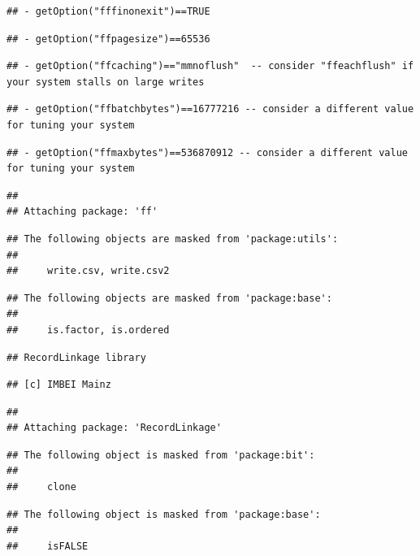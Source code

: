 \documentclass[
]{article}
\begin{document}
\begin{verbatim}
## - getOption("fffinonexit")==TRUE
\end{verbatim}

\begin{verbatim}
## - getOption("ffpagesize")==65536
\end{verbatim}

\begin{verbatim}
## - getOption("ffcaching")=="mmnoflush"  -- consider "ffeachflush" if your system stalls on large writes
\end{verbatim}

\begin{verbatim}
## - getOption("ffbatchbytes")==16777216 -- consider a different value for tuning your system
\end{verbatim}

\begin{verbatim}
## - getOption("ffmaxbytes")==536870912 -- consider a different value for tuning your system
\end{verbatim}

\begin{verbatim}
## 
## Attaching package: 'ff'
\end{verbatim}

\begin{verbatim}
## The following objects are masked from 'package:utils':
## 
##     write.csv, write.csv2
\end{verbatim}

\begin{verbatim}
## The following objects are masked from 'package:base':
## 
##     is.factor, is.ordered
\end{verbatim}

\begin{verbatim}
## RecordLinkage library
\end{verbatim}

\begin{verbatim}
## [c] IMBEI Mainz
\end{verbatim}

\begin{verbatim}
## 
## Attaching package: 'RecordLinkage'
\end{verbatim}

\begin{verbatim}
## The following object is masked from 'package:bit':
## 
##     clone
\end{verbatim}

\begin{verbatim}
## The following object is masked from 'package:base':
## 
##     isFALSE
\end{verbatim}
\end{document}
